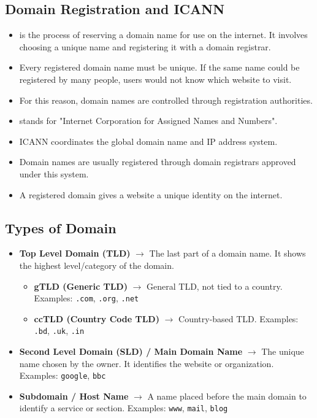 \subsection{Domain Registration and ICANN}
\begin{itemize}
    \item {} is the process of reserving a domain name for use on the internet. It involves choosing a unique name and registering it with a domain registrar.
    \item Every registered domain name must be unique. If the same name could be registered by many people, users would not know which website to visit. 
    \item For this reason, domain names are controlled through registration authorities.
    \item {} stands for "Internet Corporation for Assigned Names and Numbers".
    \item ICANN coordinates the global domain name and IP address system.
    \item Domain names are usually registered through domain registrars approved under this system.
    \item A registered domain gives a website a unique identity on the internet.
\end{itemize}

\subsection{Types of Domain}

\begin{itemize}
    \item \textbf{Top Level Domain (TLD)} $\rightarrow$ The last part of a domain name. It shows the highest level/category of the domain.
    \begin{itemize}
        \item \textbf{gTLD (Generic TLD)} $\rightarrow$ General TLD, not tied to a country. Examples: \texttt{.com}, \texttt{.org}, \texttt{.net}
        \item \textbf{ccTLD (Country Code TLD)} $\rightarrow$ Country-based TLD. Examples: \texttt{.bd}, \texttt{.uk}, \texttt{.in}
    \end{itemize}

    \item \textbf{Second Level Domain (SLD) / Main Domain Name} $\rightarrow$ The unique name chosen by the owner. It identifies the website or organization. Examples: \texttt{google}, \texttt{bbc}

    \item \textbf{Subdomain / Host Name} $\rightarrow$ A name placed before the main domain to identify a service or section. Examples: \texttt{www}, \texttt{mail}, \texttt{blog}
\end{itemize}

